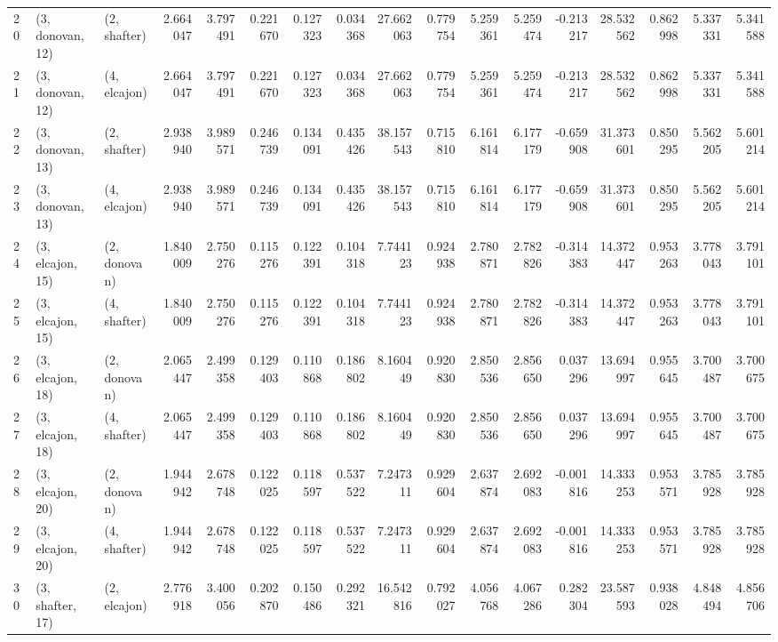 \begin{tabular}{lllrrrrrrrrrrrrrr}
20 &  (3, donovan, 12) &     (2, shafter) &  2.664047 &  3.797491 &   0.221670 &  0.127323 &  0.034368 &  27.662063 &  0.779754 &   5.259361 &  5.259474 & -0.213217 &  28.532562 &  0.862998 &  5.337331 &  5.341588 \\
21 &  (3, donovan, 12) &     (4, elcajon) &  2.664047 &  3.797491 &   0.221670 &  0.127323 &  0.034368 &  27.662063 &  0.779754 &   5.259361 &  5.259474 & -0.213217 &  28.532562 &  0.862998 &  5.337331 &  5.341588 \\
22 &  (3, donovan, 13) &     (2, shafter) &  2.938940 &  3.989571 &   0.246739 &  0.134091 &  0.435426 &  38.157543 &  0.715810 &   6.161814 &  6.177179 & -0.659908 &  31.373601 &  0.850295 &  5.562205 &  5.601214 \\
23 &  (3, donovan, 13) &     (4, elcajon) &  2.938940 &  3.989571 &   0.246739 &  0.134091 &  0.435426 &  38.157543 &  0.715810 &   6.161814 &  6.177179 & -0.659908 &  31.373601 &  0.850295 &  5.562205 &  5.601214 \\
24 &  (3, elcajon, 15) &     (2, donovan) &  1.840009 &  2.750276 &   0.115276 &  0.122391 &  0.104318 &   7.744123 &  0.924938 &   2.780871 &  2.782826 & -0.314383 &  14.372447 &  0.953263 &  3.778043 &  3.791101 \\
25 &  (3, elcajon, 15) &     (4, shafter) &  1.840009 &  2.750276 &   0.115276 &  0.122391 &  0.104318 &   7.744123 &  0.924938 &   2.780871 &  2.782826 & -0.314383 &  14.372447 &  0.953263 &  3.778043 &  3.791101 \\
26 &  (3, elcajon, 18) &     (2, donovan) &  2.065447 &  2.499358 &   0.129403 &  0.110868 &  0.186802 &   8.160449 &  0.920830 &   2.850536 &  2.856650 &  0.037296 &  13.694997 &  0.955645 &  3.700487 &  3.700675 \\
27 &  (3, elcajon, 18) &     (4, shafter) &  2.065447 &  2.499358 &   0.129403 &  0.110868 &  0.186802 &   8.160449 &  0.920830 &   2.850536 &  2.856650 &  0.037296 &  13.694997 &  0.955645 &  3.700487 &  3.700675 \\
28 &  (3, elcajon, 20) &     (2, donovan) &  1.944942 &  2.678748 &   0.122025 &  0.118597 &  0.537522 &   7.247311 &  0.929604 &   2.637874 &  2.692083 & -0.001816 &  14.333253 &  0.953571 &  3.785928 &  3.785928 \\
29 &  (3, elcajon, 20) &     (4, shafter) &  1.944942 &  2.678748 &   0.122025 &  0.118597 &  0.537522 &   7.247311 &  0.929604 &   2.637874 &  2.692083 & -0.001816 &  14.333253 &  0.953571 &  3.785928 &  3.785928 \\
30 &  (3, shafter, 17) &     (2, elcajon) &  2.776918 &  3.400056 &   0.202870 &  0.150486 &  0.292321 &  16.542816 &  0.792027 &   4.056768 &  4.067286 &  0.282304 &  23.587593 &  0.938028 &  4.848494 &  4.856706 \\

\end{tabular}
